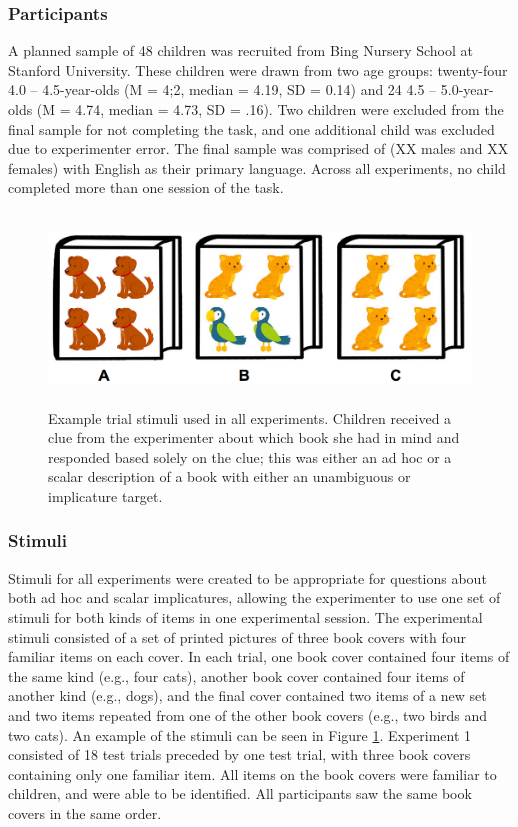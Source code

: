 \documentclass[man]{apa2}
\begin{document}
\subsubsection{Participants} A planned sample of 48 children was recruited from Bing Nursery School at Stanford University. These children were drawn from two age groups: twenty-four 4.0 -- 4.5-year-olds (M = 4;2, median = 4.19, SD = 0.14) and 24 4.5 -- 5.0-year-olds (M = 4.74, median = 4.73, SD = .16). Two children were excluded from the final sample for not completing the task, and one additional child was excluded due to experimenter error. The final sample was comprised of (XX males and XX females) with English as their primary language. Across all experiments, no child completed more than one session of the task. 

\begin{figure} 
 \begin{center} 
  \includegraphics[height=2in]{figures/implicatures_demo_letters.png} 
  \caption{\label{fig:demo} Example trial stimuli used in all experiments. Children received a clue from the experimenter about which book she had in mind and responded based solely on the clue; this was either an ad hoc or a scalar description of a book with either an unambiguous or implicature target.} 
 \end{center} 
\end{figure}	 

\subsubsection{Stimuli}
Stimuli for all experiments were created to be appropriate for questions about both ad hoc and scalar implicatures, allowing the experimenter to use one set of stimuli for both kinds of items in one experimental session. The experimental stimuli consisted of a set of printed pictures of three book covers with four familiar items on each cover. In each trial, one book cover contained four items of the same kind (e.g., four cats), another book cover contained four items of another kind (e.g., dogs), and the final cover contained two items of a new set and two items repeated from one of the other book covers (e.g., two birds and two cats). An example of the stimuli can be seen in Figure \ref{fig:demo}. Experiment 1 consisted of 18 test trials preceded by one test trial, with three book covers containing only one familiar item. All items on the book covers were familiar to children, and were able to be identified. All participants saw the same book covers in the same order. 
\end{document}
